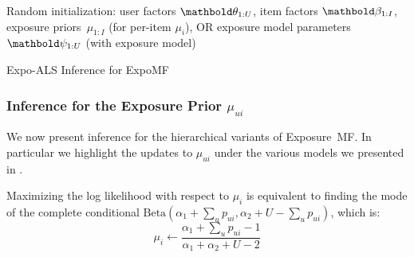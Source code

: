 \begin{algorithm}
\DontPrintSemicolon %
Random initialization: user factors $\mb\theta_{1:U}$, item factors $\mb\beta_{1:I}$, exposure priors~$\mu_{1:I}$ (for per-item $\mu_i$), OR exposure model parameters $\mb\psi_{1:U}$ (with exposure model)\;
\;
\caption{{\sc Expo-ALS} Inference for ExpoMF}
\label{alg:exposure_mf}
\end{algorithm}

\subsubsection*{Inference for the Exposure Prior $\mu_{ui}$}
\label{sec:inf_hier_model}
We now present inference for the hierarchical variants of Exposure~MF. 
In particular we highlight the updates to 
$\mu_{ui}$ under the various models we presented in .

 Maximizing the log likelihood with respect to $\mu_i$ is equivalent to finding the mode of the complete conditional $\text{Beta}(\alpha_1 + \sum_u p_{ui}, \alpha_2 + U - \sum_u p_{ui})$, which is:
\begin{equation}\label{eq:mu_i}
\mu_i \leftarrow \frac{\alpha_1 + \sum_u p_{ui}- 1}{\alpha_1 + \alpha_2 + U - 2}
\end{equation}

